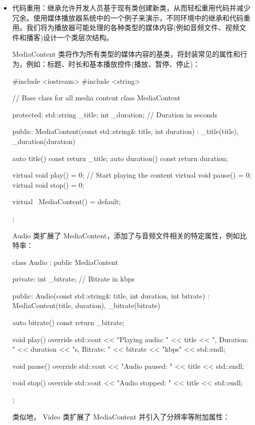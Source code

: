 \begin{itemize}
\item
代码重用：继承允许开发人员基于现有类创建新类，从而轻松重用代码并减少冗余。使用媒体播放器系统中的一个例子来演示，不同环境中的继承和代码重用。我们将为播放器可能处理的各种类型的媒体内容(例如音频文件、视频文件和播客)设计一个类层次结构。

MediaContent 类将作为所有类型的媒体内容的基类，将封装常见的属性和行为，例如：标题、时长和基本播放控件(播放、暂停、停止)：

\begin{cpp}
#include <iostream>
#include <string>

// Base class for all media content
class MediaContent {
protected:
    std::string _title;
    int _duration; // Duration in seconds

public:
    MediaContent(const std::string& title, int duration)
        : _title(title), _duration(duration) {}

    auto title() const { return _title; }
    auto duration() const { return duration; }

    virtual void play() = 0; // Start playing the content
    virtual void pause() = 0;
    virtual void stop() = 0;

    virtual ~MediaContent() = default;
};
\end{cpp}

Audio 类扩展了 MediaContent，添加了与音频文件相关的特定属性，例如比特率：

\begin{cpp}
class Audio : public MediaContent {
private:
    int _bitrate; // Bitrate in kbps

public:
    Audio(const std::string& title, int duration, int bitrate)
        : MediaContent(title, duration), _bitrate(bitrate) {}

    auto bitrate() const { return _bitrate; }

    void play() override {
        std::cout << "Playing audio: " << title << ", Duration: " << duration << "s, Bitrate: " << bitrate << "kbps" << std::endl;
    }

    void pause() override {
        std::cout << "Audio paused: " << title << std::endl;
    }

    void stop() override {
        std::cout << "Audio stopped: " << title << std::endl;
    }
};
\end{cpp}

类似地， Video 类扩展了 MediaContent 并引入了分辨率等附加属性：


\end{itemize}
